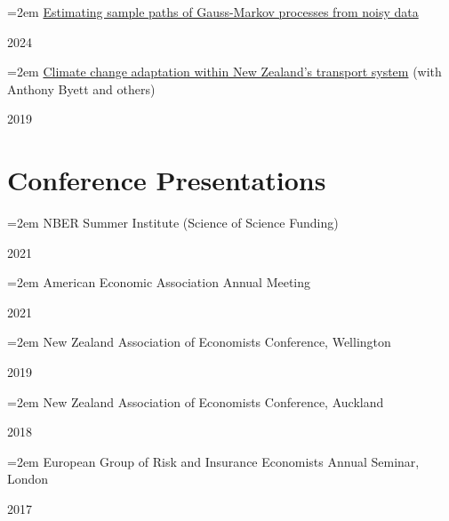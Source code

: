 \documentclass[11pt,oneside]{memoir}
\newcommand{\entry}[2]{\par\parbox[t]{0.9\linewidth}{\strut\raggedright\hangindent=2em #2\strut}\hfill#1}
\begin{document}
\entry{2024}{\href{https://arxiv.org/abs/2404.00784}{Estimating sample paths of Gauss-Markov processes from noisy data}}
\entry{2019}{\href{https://motu.nz/assets/Documents/our-work/environment/climate-change-impacts/Transport-Dialogue-Report.pdf}{Climate change adaptation within New Zealand's transport system} (with Anthony Byett and others)}

\section{Conference Presentations}

\entry{2021}{NBER Summer Institute (Science of Science Funding)}
\entry{2021}{American Economic Association Annual Meeting}
\entry{2019}{New Zealand Association of Economists Conference, Wellington}
\entry{2018}{New Zealand Association of Economists Conference, Auckland}
\entry{2017}{European Group of Risk and Insurance Economists Annual Seminar, London}
\end{document}
